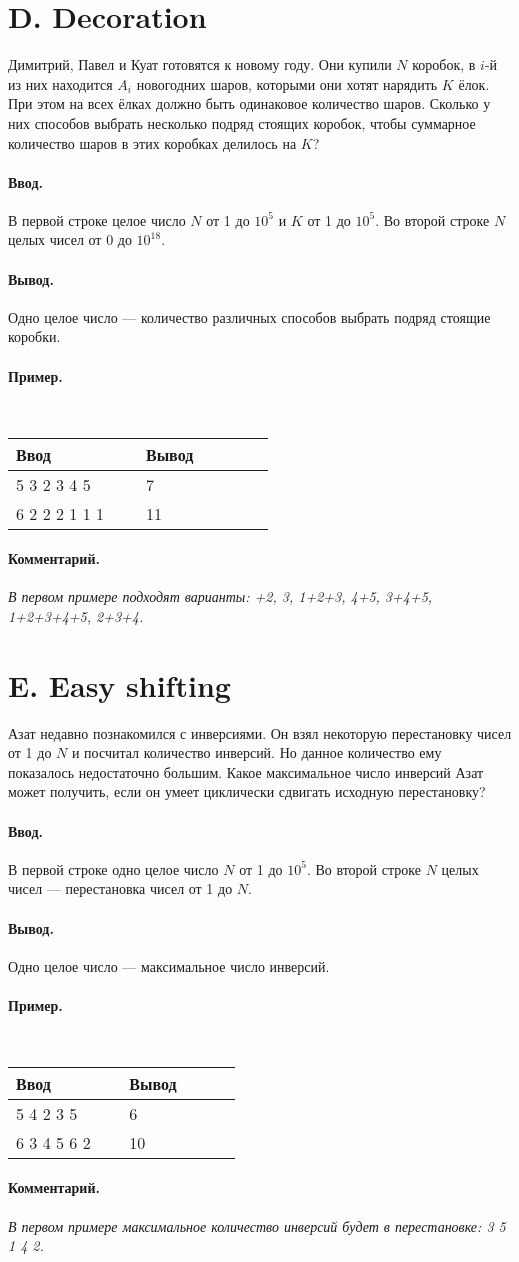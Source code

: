 \documentclass[10pt, a5paper]{article}
\newcommand{\informat}[1]
{
	\paragraph{Ввод.\\} #1
}
\newcommand{\outformat}[1]
{
	\paragraph{Вывод.\\} #1
}
\newcommand{\examplee}[4]
{
	\paragraph{Пример.\\}
	{\tt
	\begin{tabular}{|p{0.4\linewidth}|p{0.4\linewidth}|}
	\hline
	Ввод 	& Вывод  	\\
	\hline
	#1 		& #2 		\\
	\hline
	#3		& #4		\\
	\hline
	\end{tabular}
	}
}
\newcommand{\excomm}[1]
{
	\paragraph{Комментарий. \\}
	\textit{#1}
}
\begin{document}
\section*{D. Decoration}


Димитрий, Павел и Куат готовятся к новому году. Они купили $N$ коробок, в $i$-й из них находится $A_i$ новогодних шаров, которыми они хотят нарядить $K$ ёлок. При этом на всех ёлках должно быть одинаковое количество шаров. Сколько у них способов выбрать несколько подряд стоящих коробок, чтобы суммарное количество шаров в этих коробках делилось на $K$?

\informat{В первой строке целое число $N$ от 1 до $10^5$ и $K$ от 1 до $10^5$. \newline
Во второй строке $N$ целых чисел от 0 до $10^{18}$.}

\outformat{Одно целое число --- количество различных способов выбрать подряд стоящие коробки.}

\examplee
{5 3  2 3 4 5}
{7}
{6 2 \newline
2 2 2 1 1 1}
{11}

\excomm{В первом примере подходят варианты: \newline 1+2, 3, 1+2+3, 4+5, 3+4+5, 1+2+3+4+5, 2+3+4.}



\section*{E. Easy shifting}


Азат недавно познакомился с инверсиями. Он взял некоторую перестановку чисел от 1 до $N$ и посчитал количество инверсий. Но данное количество ему показалось недостаточно большим. Какое максимальное число инверсий Азат может получить, если он умеет циклически сдвигать исходную перестановку?

\informat{В первой строке одно целое число $N$ от 1 до $10^5$. \newline 
Во второй строке $N$ целых чисел --- перестановка чисел от 1 до $N$.}

\outformat{Одно целое число --- максимальное число инверсий.}

\examplee
{5 \newline
1 4 2 3 5}
{6}
{6 \newline
1 3 4 5 6 2}
{10}

\excomm{В первом примере максимальное количество инверсий будет в перестановке: 3 5 1 4 2.}
\end{document}
